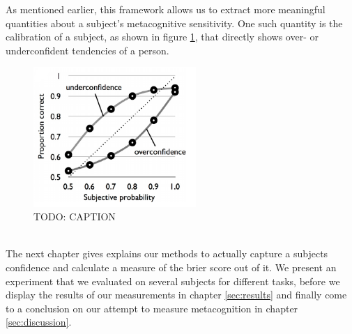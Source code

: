 \documentclass[../main/main.tex]{subfiles}
\begin{document}
	As mentioned earlier, this framework allows us to extract more meaningful quantities about a subject's metacognitive sensitivity. One such quantity is the calibration of a subject, as shown in figure \ref{fig:calibration}, that directly shows over- or underconfident tendencies of a person.
	\begin{figure}[h]
		\centering
		\captionsetup{justification=centering}
		\includegraphics[width=0.55\textwidth]{../assets/calibration_curve.png}
		\caption{TODO: CAPTION} 
		\label{fig:calibration}
	\end{figure}\\
	The next chapter gives explains our methods to actually capture a subjects confidence and calculate a measure of the brier score out of it. We present an experiment that we evaluated on several subjects for different tasks, before we display the results of our measurements in chapter \ref{sec:results} and finally come to a conclusion on our attempt to measure metacognition in chapter \ref{sec:discussion}.
	
\end{document}
